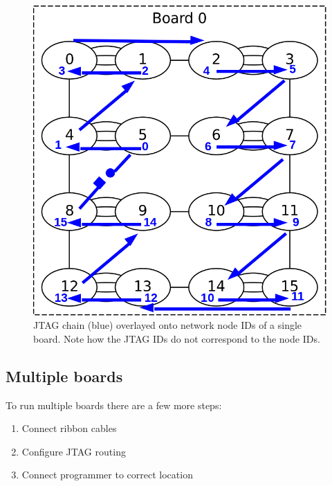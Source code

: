 \documentclass[12pt,a4paper,final,twoside]{article}
\begin{document}
\begin{figure}[htbp]
\centering
\includegraphics[scale=0.5]{jtag-single.png}
\caption{JTAG chain (blue) overlayed onto network node IDs of a single board. Note how the JTAG IDs do not correspond to the node IDs.}
\end{figure}

\subsection{Multiple boards}

To run multiple boards there are a few more steps:

\begin{enumerate}
\item Connect ribbon cables
\item Configure JTAG routing
\item Connect programmer to correct location
\end{enumerate}
\end{document}
